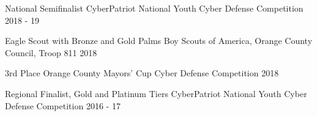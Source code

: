 



\begin{cvhonors}

  \cvhonor
    {National Semifinalist} %
    {CyberPatriot National Youth Cyber Defense Competition} %
    {} %
    {2018 - 19} %
    
  \cvhonor
    {Eagle Scout with Bronze and Gold Palms} %
    {Boy Scouts of America, Orange County Council, Troop 811} %
    {} %
    {2018} %

  \cvhonor
    {3rd Place} %
    {Orange County Mayors' Cup Cyber Defense Competition} %
    {} %
    {2018} %

  \cvhonor
    {Regional Finalist, Gold and Platinum Tiers} %
    {CyberPatriot National Youth Cyber Defense Competition} %
    {} %
    {2016 - 17} %

\end{cvhonors}





